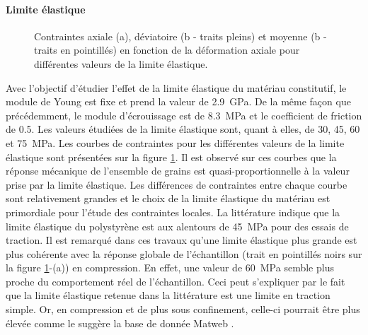 	\paragraph{Limite élastique\\}
		\begin{figure}\centering
			\hfill
			\caption{\label{fig06:material_effect_Re}Contraintes axiale (a), déviatoire (b - traits pleins) et moyenne (b - traits en pointillés) en fonction de la déformation axiale pour différentes valeurs de la limite élastique.}
		\end{figure}
		Avec l'objectif d'étudier l'effet de la limite élastique du matériau constitutif, le module de Young est fixe et prend la valeur de \SI{2.9}{\giga\pascal}. De la même façon que précédemment, le module d'écrouissage est de \SI{8.3}{\mega\pascal} et le coefficient de friction de \num{0.5}. Les valeurs étudiées de la limite élastique sont, quant à elles, de \num{30}, \num{45}, \num{60} et \SI{75}{\mega\pascal}. Les courbes de contraintes pour les différentes valeurs de la limite élastique sont présentées sur la figure \ref{fig06:material_effect_Re}. Il est observé sur ces courbes que la réponse mécanique de l'ensemble de grains est quasi-proportionnelle à la valeur prise par la limite élastique. Les différences de contraintes entre chaque courbe sont relativement grandes et le choix de la limite élastique du matériau est primordiale pour l'étude des contraintes locales. La littérature \citep{wypych_handbook_2016, matweb} indique que la limite élastique du polystyrène est aux alentours de \SI{45}{\mega\pascal} pour des essais de traction. Il est remarqué dans ces travaux qu'une limite élastique plus grande est plus cohérente avec la réponse globale de l'échantillon (trait en pointillés noirs sur la figure \ref{fig06:material_effect_Re}-(a)) en compression. En effet, une valeur de \SI{60}{\mega\pascal} semble plus proche du comportement réel de l'échantillon. Ceci peut s'expliquer par le fait que la limite élastique retenue dans la littérature est une limite en traction simple. Or, en compression et de plus sous confinement, celle-ci pourrait être plus élevée comme le suggère la base de donnée Matweb \citep{matweb}.
